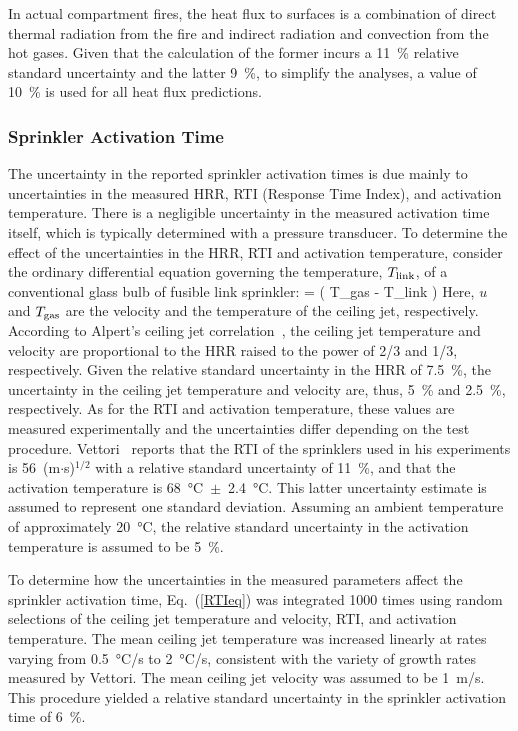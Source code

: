 In actual compartment fires, the heat flux to surfaces is a combination of direct thermal radiation from the fire and indirect radiation and convection from the hot gases. Given that the calculation of the former incurs a 11~\% relative standard uncertainty and the latter 9~\%, to simplify the analyses, a value of 10~\% is used for all heat flux predictions.

\subsubsection{Sprinkler Activation Time}
\label{uncertainty_sprinkler_acts}

The uncertainty in the reported sprinkler activation times is due mainly to uncertainties in the measured HRR, RTI (Response Time Index), and activation temperature. There is a negligible uncertainty in the measured activation time itself, which is typically determined with a pressure transducer. To determine the effect of the uncertainties in the HRR, RTI and activation temperature, consider the ordinary differential equation governing the temperature, $T_{\rm link}$, of a conventional glass bulb of fusible link sprinkler:
\be
    =  \left( T_{\rm gas} - T_{\rm link} \right) \label{RTIeq}
\ee
Here, $u$ and $T_{\rm gas}$  are the velocity and the temperature of the ceiling jet, respectively. According to Alpert's ceiling jet correlation~\cite{SFPE:Alpert}, the ceiling jet temperature and velocity are proportional to the HRR raised to the power of 2/3 and 1/3, respectively. Given the relative standard uncertainty in the HRR of 7.5~\%, the uncertainty in the ceiling jet temperature and velocity are, thus, 5~\% and 2.5~\%, respectively. As for the RTI and activation temperature, these values are measured experimentally and the uncertainties differ depending on the test procedure. Vettori~\cite{Vettori:1} reports that the RTI of the sprinklers used in his experiments is 56~(m$\cdot$s)$^{1/2}$ with a relative standard uncertainty of 11~\%, and that the activation temperature is 68~\unit{\degreeCelsius}~$\pm$~2.4~\unit{\degreeCelsius}. This latter uncertainty estimate is assumed to represent one standard deviation. Assuming an ambient temperature of approximately 20~\unit{\degreeCelsius}, the relative standard uncertainty in the activation temperature is assumed to be 5~\%.

To determine how the uncertainties in the measured parameters affect the sprinkler activation time, Eq.~(\ref{RTIeq}) was integrated 1000 times using random selections of the ceiling jet temperature and velocity, RTI, and activation temperature. The mean ceiling jet temperature was increased linearly at rates varying from 0.5~\unit{\degreeCelsius}/s to 2~\unit{\degreeCelsius}/s, consistent with the variety of growth rates measured by Vettori. The mean ceiling jet velocity was assumed to be 1~m/s. This procedure yielded a relative standard uncertainty in the sprinkler activation time of 6~\%.


